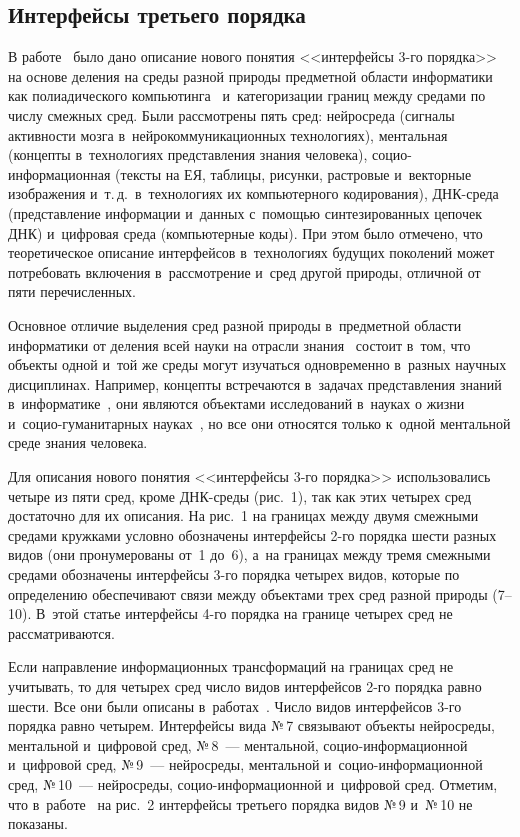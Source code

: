 \begin{multicols}{2}
\section{Интерфейсы третьего порядка}

  В работе~\cite{2-zac} было дано описание нового понятия <<интерфейсы  
3-го порядка>> на основе деления на среды разной природы предметной 
области информатики как полиадического компьютинга~\cite{5-zac} 
и~категоризации границ между средами по числу смежных сред. Были 
рассмотрены пять сред: нейросреда (сигналы активности мозга 
в~нейрокоммуникационных технологиях), ментальная (кон\-цеп\-ты в~технологиях 
пред\-став\-ле\-ния знания человека), со\-цио-ин\-фор\-ма\-ци\-он\-ная (тексты на 
ЕЯ, таб\-ли\-цы, рисунки, раст\-ро\-вые и~векторные изоб\-ра\-же\-ния 
и~т.\,д.\ в~технологиях их компьютерного кодирования), ДНК-сре\-да 
(представление информации и~данных с~по\-мощью синтезированных цепочек 
ДНК) и~циф\-ро\-вая среда (компьютерные коды). При этом было отмечено, что 
тео\-ре\-ти\-че\-ское описание интерфейсов в~технологиях будущих поколений может 
по\-тре\-бо\-вать включения в~рас\-смот\-ре\-ние и~сред другой природы, отличной от 
пяти перечисленных.
  
  Основное отличие выделения сред разной природы в~предметной области 
информатики от деления всей науки на отрасли знания~\cite{6-zac} состоит 
в~том, что объекты одной и~той же среды могут изучаться одновременно 
в~разных научных дисциплинах. Например, концепты встречаются в~задачах 
представления знаний в~информатике~\cite{1-zac, 7-zac, 8-zac}, они являются 
объектами исследований в~науках о жизни~\cite{9-zac}  
и~со\-цио-гу\-ма\-ни\-тар\-ных науках~\cite{10-zac}, но все они относятся 
только к~одной ментальной среде знания человека.
  
  Для описания нового понятия <<интерфейсы \mbox{3-го} порядка>> использовались 
четыре из пяти сред, кроме ДНК-сре\-ды (рис.~1), так как этих четырех сред 
достаточно для их описания. На рис.~1 на границах между двумя смежными 
средами кружками условно обозначены интерфейсы 2-го порядка шес\-ти разных 
видов (они пронумерованы от~1 до~6), а~на границах между тремя смежными 
средами обозначены интерфейсы 3-го порядка четырех видов, которые по 
определению обеспечивают связи между объектами трех сред разной природы 
(7--10). В~этой статье интерфейсы 4-го порядка на границе четырех сред не 
рассматриваются.


  Если направление информационных трансформаций на границах сред не 
учитывать, то для четырех сред число видов интерфейсов 2-го порядка равно 
шести. Все они были описаны в~работах~\cite{2-zac, 7-zac}. Число видов 
интерфейсов 3-го порядка равно четырем. Интерфейсы вида №\,7 связывают 
объекты нейросреды, ментальной и~цифровой сред, №\,8~--- ментальной,  
со\-цио-ин\-фор\-ма\-ци\-он\-ной и~цифровой сред, №\,9~--- нейросреды,  
ментальной и~со\-цио-ин\-фор\-ма\-ци\-он\-ной сред, №\,10~--- нейросреды,  
со\-цио-ин\-фор\-ма\-ци\-он\-ной и~цифровой сред. Отметим, что 
в~работе~\cite{2-zac} на рис.~2 интерфейсы третьего порядка видов №\,9 
и~№\,10 не показаны.
  

\end{multicols}
